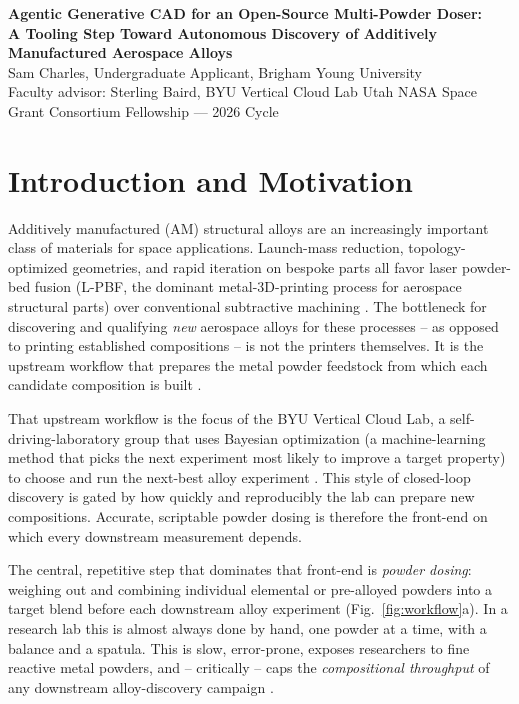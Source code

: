 \documentclass[11pt]{article}
\begin{document}
\begin{center}
  {\Large\bfseries Agentic Generative CAD for an Open-Source Multi-Powder Doser:\\
   A Tooling Step Toward Autonomous Discovery of Additively Manufactured
   Aerospace Alloys}\\[3pt]
  {\large Sam Charles, Undergraduate Applicant, Brigham Young University}\\[1pt]
  {\small Faculty advisor: Sterling Baird, BYU Vertical Cloud Lab \quad\textbar\quad
   Utah NASA Space Grant Consortium Fellowship --- 2026 Cycle}
\end{center}
\vspace{0.2\baselineskip}

\section{Introduction and Motivation}

Additively manufactured (AM) structural alloys are an increasingly
important class of materials for space applications.  Launch-mass
reduction, topology-optimized geometries, and rapid iteration on bespoke
parts all favor laser powder-bed fusion (L-PBF, the dominant
metal-3D-printing process for aerospace structural parts) over
conventional subtractive machining \citep{wei2021multimaterial}.  The bottleneck for discovering
and qualifying \emph{new} aerospace alloys for these processes -- as
opposed to printing established compositions -- is not the printers
themselves.  It is the upstream workflow that prepares the metal powder
feedstock from which each candidate composition is built
\citep{vecchio2024htread,liu2024htprep}.

That upstream workflow is the focus of the BYU Vertical Cloud Lab, a
self-driving-laboratory group that uses Bayesian optimization (a
machine-learning method that picks the next experiment most likely to
improve a target property) to choose and run the next-best alloy
experiment \citep{tom2024sdl,lo2024frugal}.  This style of closed-loop
discovery is gated by how quickly and reproducibly the lab can prepare
new compositions.  Accurate, scriptable powder dosing is therefore the
front-end on which every downstream measurement depends.

The central, repetitive step that dominates that front-end is
\emph{powder dosing}: weighing out and combining individual elemental or
pre-alloyed powders into a target blend before each downstream alloy
experiment (Fig.~\ref{fig:workflow}a).  In a research lab this is
almost always done by hand, one powder at a time, with a balance and a
spatula.  This is slow, error-prone, exposes researchers to fine
reactive metal powders, and -- critically -- caps the
\emph{compositional throughput} of any downstream alloy-discovery
campaign \citep{vecchio2021htread}.
\end{document}
